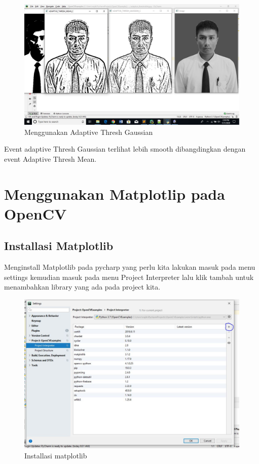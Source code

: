 \newpage
\begin{figure}[ht]
\centering
\includegraphics[scale=0.5]{figures/2,45.jpg}
\caption{Menggunakan Adaptive Thresh Gaussian}
\label{contoh}
\end{figure}
Event adaptive Thresh Gaussian terlihat lebih smooth dibangdingkan dengan event Adaptive Thresh Mean.




\newpage
\section{Menggunakan Matplotlip pada OpenCV}
\subsection{Installasi Matplotlib}
Menginstall Matplotlib pada pycharp yang perlu kita lakukan masuk pada menu settings kemudian masuk pada menu Project Interpreter lalu klik tambah untuk menambahkan library yang ada pada project kita.
\begin{figure}[ht]
\centering
\includegraphics[scale=0.45]{figures/2,46.jpg}
\caption{Installasi matplotlib}
\label{contoh}
\end{figure}

